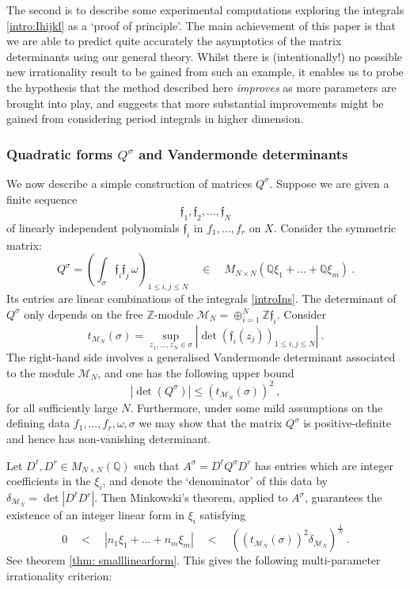 \documentclass[a4paper,10pt]{amsart}
\theoremstyle{definition}
\theoremstyle{remark}
\numberwithin{equation}{section}
\newcommand{\Z}{\mathbb Z}
\newcommand{\Q}{\mathbb Q}
\newcommand{\ff}{\mathfrak{f}}
\newcommand{\0}{\color{blue}{\mathsf{0}}}
\begin{document}
The second is to  describe some experimental computations exploring the integrals \eqref{intro:Ihijkl}  as a `proof of principle'.    The main achievement of this paper is that we are able to predict
quite accurately the asymptotics of the matrix determinants using our general theory.  Whilst there is (intentionally!) no possible new irrationality result to be gained from such an example, it enables us to probe the hypothesis that the method described here \emph{improves} as more parameters are brought into play, and suggests that more substantial improvements might be gained from  considering period integrals in higher dimension.



\subsubsection{Quadratic forms $Q^{\sigma}$ and Vandermonde determinants}
We now describe a simple construction of matrices $Q^{\sigma}$. Suppose we are given a finite sequence 
\begin{equation} \label{introff}   \ff_1 ,\ff_2 ,\ldots , \ff_N   \end{equation}
 of linearly independent polynomials  $\ff_i$ in    $f_1,\ldots, f_r$ on $X$.    Consider the symmetric matrix:
   \[  Q^{\sigma} =   \left(\int_{\sigma} \ff_i  \ff_j \,   \omega  \right)_{1\leq i,j\leq N} \quad \in \quad  M_{N\times N}( \Q\xi_1 + \ldots+  \Q \xi_m) \ .\]
    Its  entries are linear combinations of  the integrals \eqref{introIns}. 
The determinant of $Q^{\sigma}$ only depends on the free $\Z$-module $\mathcal{M}_N= \oplus_{i=1}^N \Z \ff_i$.  Consider
  \[  t_{\mathcal{M}_N}(\sigma) =  \sup_{z_1,\ldots, z_N \in \sigma} \left| \det ( \ff_i(z_j) )_{1\leq i,j\leq N} \right| \ . \]
The right-hand side  involves a  generalised Vandermonde determinant associated to the module $\mathcal{M}_N$, and one has the following upper bound
 \[  \left|\det (Q^{\sigma}) \right|  \leq    \left( t_{\mathcal{M}_N}(\sigma)\right)^2 \ ,  \]
 for all sufficiently large $N$. Furthermore, under some mild assumptions on the defining data  $f_1,\ldots, f_r, \omega, \sigma$ we may show that the matrix $Q^{\sigma}$ is positive-definite and hence has non-vanishing determinant.
 
 Let $D^{\ell},D^r \in M_{N\times N}(\Q)$ such that $A^{\sigma} = D^{\ell} Q^{\sigma} D^r$ has entries which are integer coefficients in the $\xi_i$, and denote the `denominator'  of this data by  $\delta_{\mathcal{M}_N} =  \det |D^{\ell}D^r|$.  
Then Minkowski's theorem, applied to $A^{\sigma}$,   guarantees the existence of an integer linear form in $\xi_i$   satisfying 
\[ 0 \quad < \quad \left|  n_1 \xi_1 + \ldots + n_m \xi_m\right| \quad  < \quad        \left(\left( t_{\mathcal{M}_N}(\sigma)\right)^2  \delta_{\mathcal{M}_N} \right)^{\frac{1}{N}}\ . \]
See theorem \ref{thm: smalllinearform}. This gives the following multi-parameter irrationality criterion:
\end{document}
